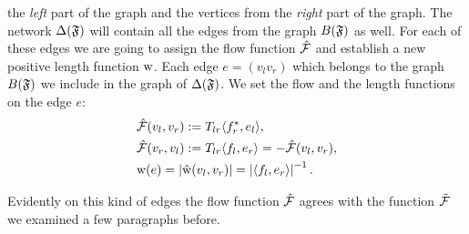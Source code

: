 \documentclass[12pt]{article}
\begin{document}
    the \emph{left} part of the graph and the vertices from the \emph{right} part of the graph.
    The network $\Delta(\mathfrak{F})$ will contain all the edges from the graph $B(\mathfrak{F})$ as well.
    For each of these edges we are going to assign the flow function $\mathcal{\hat{F}}$ and
    establish a new positive length function $\mathrm{w}$.
    Each edge $e = (v_l v_r)$ which belongs to the graph $B(\mathfrak{F})$ we include in the graph of $\Delta(\mathfrak{F})$.
    We set the flow and the length functions on the edge $e$:
    \begin{align*}
      &\mathcal{\hat{F}}(v_l, v_r) := T_{lr} \langle f^*_r, e_l \rangle,\\
      &\mathcal{\hat{F}}(v_r, v_l) := T_{lr} \langle f_l, e_r \rangle = -\mathcal{\hat{F}}(v_l, v_r),\\
      &\mathrm{w}(e) = \left| \mathrm{\hat{w}}(v_l, v_r) \right| =  \left|\langle f_l, e_r \rangle\right|^{-1}.
    \end{align*}
    \begin{note}
      Evidently on this kind of edges the flow function $\mathcal{\hat{F}}$ agrees with the function $\mathcal{\tilde{F}}$
        we examined a few paragraphs before.
    \end{note}
\end{document}
